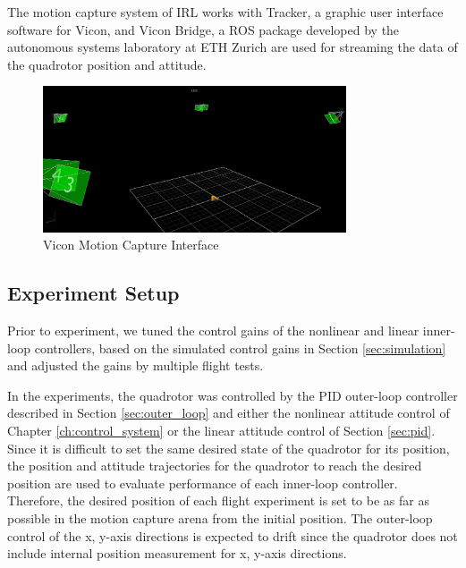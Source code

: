 The motion capture system of IRL works with Tracker, a graphic user interface software for Vicon, and Vicon Bridge, a ROS package developed by the autonomous systems laboratory at ETH Zurich are used for streaming the data of the quadrotor position and attitude.

\begin{figure}
    \centering
    \includegraphics[width=0.8\textwidth]{graphics/tracker.png}
    \caption{Vicon Motion Capture Interface}
    \label{fig:arena}
\end{figure}

\subsection{Experiment Setup}

Prior to experiment, we tuned the control gains of the nonlinear and linear inner-loop controllers, based on the simulated control gains in Section \ref{sec:simulation} and adjusted the gains by multiple flight tests.

In the experiments, the quadrotor was controlled by the PID outer-loop controller described in Section \ref{sec:outer_loop} and either the nonlinear attitude control of Chapter \ref{ch:control_system} or the linear attitude control of Section \ref{sec:pid}. Since it is difficult to set the same desired state of the quadrotor for its position, the position and attitude trajectories for the quadrotor to reach the desired position are used to evaluate performance of each inner-loop controller. Therefore, the desired position of each flight experiment is set to be as far as possible in the motion capture arena from the initial position. The  outer-loop control of the x, y-axis directions is expected to drift since the quadrotor does not include internal position measurement for x, y-axis directions.

